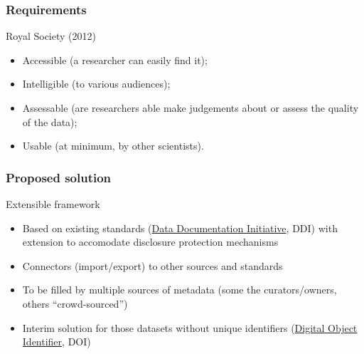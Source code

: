 \begin{frame}
\frametitle{Requirements}
\begin{block}{Royal Society (2012)}
\begin{itemize}
\item Accessible (a researcher can easily find it);
\item Intelligible (to various audiences);
\item Assessable (are researchers able make judgements about or
assess the quality of the data);
\item Usable (at minimum, by other scientists).
\end{itemize}
\end{block}
\end{frame}


\begin{frame}
\frametitle{Proposed solution}
\begin{block}{Extensible framework}
\begin{itemize}[<+->]
\item Based on existing standards (\href{http://www.ddialliance.org}{Data Documentation Initiative}, DDI) with extension to accomodate disclosure protection mechanisms
\item Connectors (import/export) to other sources and standards
\item To be filled by multiple sources of metadata (some the curators/owners, others ``crowd-sourced'')
\item Interim solution for those datasets without unique identifiers (\href{http://datacite.org/whatisdoi}{Digital Object Identifier}, DOI)
\end{itemize}
\end{block}
\end{frame}


